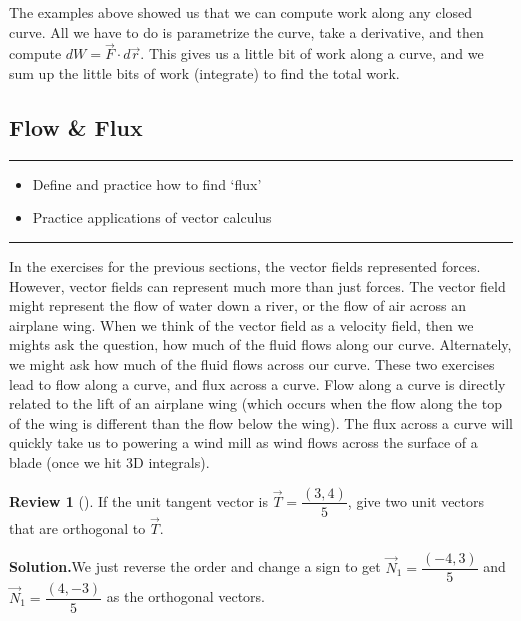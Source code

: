\documentclass[10pt,]{book}
\theoremstyle{plain}
\theoremstyle{definition}
\theoremstyle{definition}
\theoremstyle{definition}
\newtheorem{project}{Review}[section]
\theoremstyle{definition}
\newenvironment{objectives}[1]{\noindent\rule{\linewidth}{0.1ex}\newline{\textbf{{\large#1}}\par\smallskip}}{\par\noindent\rule{\linewidth}{0.1ex}\par\smallskip}
\theoremstyle{definition}
\numberwithin{equation}{section}
\begin{document}
The examples above showed us that we can compute work along any closed curve. All we have to do is parametrize the curve, take a derivative, and then compute \(dW = \vec F \cdot d\vec r\). This gives us a little bit of work along a curve, and we sum up the little bits of work (integrate) to find the total work.%
\typeout{************************************************}
\typeout{************************************************}
\subsection[{Flow \& Flux}]{Flow \& Flux}\label{subsection-49}
\begin{objectives}{Objectives}\label{objectives-23}
%
\begin{itemize}[label=\textbullet]
\item{}Define and practice how to find `flux'%
\item{}Practice applications of vector calculus%
\end{itemize}
\end{objectives}
In the exercises for the previous sections, the vector fields represented forces. However, vector fields can represent much more than just forces. The vector field might represent the flow of water down a river, or the flow of air across an airplane wing. When we think of the vector field as a velocity field, then we mights ask the question, how much of the fluid flows along our curve. Alternately, we might ask how much of the fluid flows across our curve. These two exercises lead to flow along a curve, and flux across a curve. Flow along a curve is directly related to the lift of an airplane wing (which occurs when the flow along the top of the wing is different than the flow below the wing). The flux across a curve will quickly take us to powering a wind mill as wind flows across the surface of a blade (once we hit 3D integrals).%
\begin{project}[]\label{project-20}
If the unit tangent vector is \(\vec T = \dfrac{(3,4)}{5}\), give two unit vectors that are orthogonal to \(\vec T\).%
\par\medskip\noindent%
\textbf{Solution.}\quad We just reverse the order and change a sign to get \(\vec N_1 = \dfrac{(-4,3)}{5}\) and \(\vec N_1 = \dfrac{(4,-3)}{5}\) as the orthogonal vectors.%
\end{project}
\end{document}
